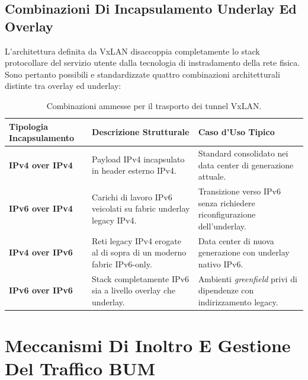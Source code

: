 \documentclass[11pt, a4paper]{article}
\begin{document}
\subsection{Combinazioni Di Incapsulamento Underlay Ed Overlay}

L'architettura definita da VxLAN disaccoppia completamente lo stack protocollare del servizio utente dalla tecnologia di instradamento della rete fisica. Sono pertanto possibili e standardizzate quattro combinazioni architetturali distinte tra overlay ed underlay:


\begin{table}[H]
    \centering
    \small
    \begin{tabularx}{\textwidth}{lXX}
        \toprule
        \textbf{Tipologia Incapsulamento} & \textbf{Descrizione Strutturale} & \textbf{Caso d'Uso Tipico} \\
        \midrule
        \textbf{IPv4 over IPv4} & Payload IPv4 incapsulato in header esterno IPv4. & Standard consolidato nei data center di generazione attuale. \\
        \textbf{IPv6 over IPv4} & Carichi di lavoro IPv6 veicolati su fabric underlay legacy IPv4. & Transizione verso IPv6 senza richiedere riconfigurazione dell'underlay. \\
        \textbf{IPv4 over IPv6} & Reti legacy IPv4 erogate al di sopra di un moderno fabric IPv6-only. & Data center di nuova generazione con underlay nativo IPv6. \\
        \textbf{IPv6 over IPv6} & Stack completamente IPv6 sia a livello overlay che underlay. & Ambienti \emph{greenfield} privi di dipendenze con indirizzamento legacy. \\
        \bottomrule
    \end{tabularx}
    \caption{Combinazioni ammesse per il trasporto dei tunnel VxLAN.}
\end{table}

\newpage


\section{Meccanismi Di Inoltro E Gestione Del Traffico BUM}
\end{document}
